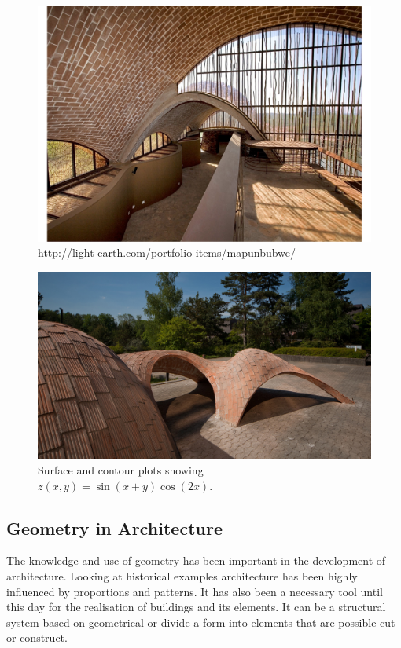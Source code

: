 \begin{figure}[H]
\centering
\includegraphics[width=0.9\linewidth ]{figure/Introduction/Vault_Contemporary.pdf}
\caption{http://light-earth.com/portfolio-items/mapunbubwe/}
\end{figure}


\begin{figure}[H]
\centering
\includegraphics[width=0.9\linewidth ]{figure/Introduction/Block_Vault.jpg}
\caption{Surface and contour plots showing $z(x,y)=\sin(x+y)\cos(2x)$.}
\end{figure}

\subsection{Geometry in Architecture}

The knowledge and use of geometry has been important in the development of architecture. Looking at historical examples architecture has been highly influenced by proportions and patterns. It has also been a necessary tool until this day for the realisation of buildings and its elements. It can be a structural system based on geometrical or divide a form into elements that are possible cut or construct.

